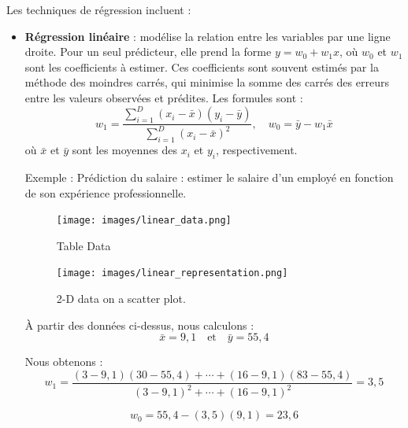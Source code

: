 \documentclass[a4paper,14pt]{article}
\begin{document}

Les techniques de régression incluent :

\begin{itemize}
    \item \textbf{Régression linéaire} : modélise la relation entre les variables par une ligne droite. Pour un seul prédicteur, elle prend la forme \( y = w_0 + w_1 x \), où \( w_0 \) et \( w_1 \) sont les coefficients à estimer. Ces coefficients sont souvent estimés par la méthode des moindres carrés, qui minimise la somme des carrés des erreurs entre les valeurs observées et prédites. Les formules sont :
    \[
    w_1 = \frac{\sum_{i=1}^D (x_i - \bar{x})(y_i - \bar{y})}{\sum_{i=1}^D (x_i - \bar{x})^2}, \quad w_0 = \bar{y} - w_1 \bar{x}
    \]
    où \( \bar{x} \) et \( \bar{y} \) sont les moyennes des \( x_i \) et \( y_i \), respectivement.


    Exemple : Prédiction du salaire : estimer le salaire d’un employé en fonction de son expérience professionnelle.

    \begin{figure}[h!]
        \begin{minipage}[b]{0.5\textwidth}
            \centering
            \texttt{[image: images/linear\_data.png]} 
            \caption{Table Data}
        \end{minipage}%
        \begin{minipage}[b]{0.5\textwidth}
            \centering
            \texttt{[image: images/linear\_representation.png]} 
            \caption{2-D data on a scatter plot.}
        \end{minipage}
    \end{figure}

        \begin{minipage}[t]{0.48\textwidth} %
        \vspace{0pt} %
        
        À partir des données ci-dessus, nous calculons :
        \[
        \bar{x} = 9{,}1 \quad \text{et} \quad \bar{y} = 55{,}4
        \]
        
        Nous obtenons :
        \[
        w_1 = \frac{(3 - 9{,}1)(30 - 55{,}4) + \cdots + (16 - 9{,}1)(83 - 55{,}4)}{(3 - 9{,}1)^2 + \cdots + (16 - 9{,}1)^2} = 3{,}5
        \]
        
        \[
        w_0 = 55{,}4 - (3{,}5)(9{,}1) = 23{,}6
        \]
        

\end{minipage}
\end{itemize}
\end{document}
